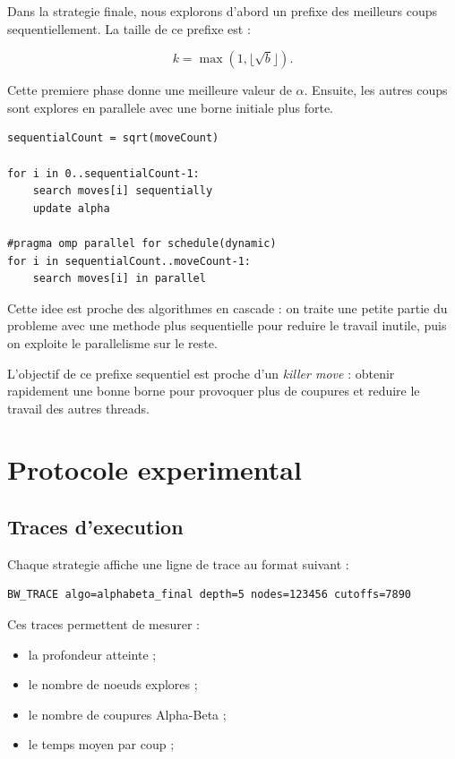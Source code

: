\documentclass[12pt,a4paper]{article}
\begin{document}
    Dans la strategie finale, nous explorons d'abord un prefixe des meilleurs coups sequentiellement.
    La taille de ce prefixe est :

    \[
        k = \max(1, \lfloor \sqrt{b} \rfloor).
    \]

    Cette premiere phase donne une meilleure valeur de $\alpha$. Ensuite, les autres coups sont explores
    en parallele avec une borne initiale plus forte.

    \begin{lstlisting}
sequentialCount = sqrt(moveCount)

for i in 0..sequentialCount-1:
    search moves[i] sequentially
    update alpha

#pragma omp parallel for schedule(dynamic)
for i in sequentialCount..moveCount-1:
    search moves[i] in parallel
    \end{lstlisting}

    Cette idee est proche des algorithmes en cascade : on traite une petite partie du probleme
    avec une methode plus sequentielle pour reduire le travail inutile, puis on exploite le parallelisme
    sur le reste.

    L'objectif de ce prefixe sequentiel est proche d'un \emph{killer move} : obtenir rapidement une bonne borne pour provoquer plus de coupures et reduire le travail des autres threads.


    \section{Protocole experimental}

    \subsection{Traces d'execution}

    Chaque strategie affiche une ligne de trace au format suivant :

    \begin{lstlisting}
BW_TRACE algo=alphabeta_final depth=5 nodes=123456 cutoffs=7890
    \end{lstlisting}

    Ces traces permettent de mesurer :

    \begin{itemize}[nosep]
    \item la profondeur atteinte ;
    \item le nombre de noeuds explores ;
    \item le nombre de coupures Alpha-Beta ;
    \item le temps moyen par coup ;
    \end{itemize}
\end{document}
